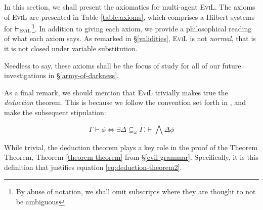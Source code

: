 In this section, we shall present the axiomatics for multi-agent
\textsc{EviL}. The axioms of \textsc{EviL} are presented in 
Table \ref{table:axioms}, which comprises a Hilbert systems for
$\vdash_{\textsc{EviL}}$\footnote{By abuse of notation, we shall omit
  subscripts where they are thought to not be ambiguous}.  In addition
to giving each axiom, we provide a philosophical reading of what each
axiom says.  As remarked in \S\ref{validities}, \textsc{EviL} is not
\emph{normal}, that is it is not closed under variable substitution.



Needless to say, these axioms shall be the focus of study for all of
our future investigations in \S\ref{army-of-darkness}.

As a final remark, we should mention that \textsc{EviL} trivially
makes true the \emph{deduction} theorem. This is because we follow
the convention set forth in \cite[Definition 4.4,
pg. 192]{blackburn_modal_2001}, and make the subsequent stipulation:
\begin{mydef}
\[ \Gamma \vdash \phi \iff  \exists \Delta \subseteq_\omega
\Gamma. \vdash \bigwedge \Delta \phi \]
\end{mydef}
While trivial, the deduction theorem plays a key role in the proof of
the Theorem Theorem, Theorem \ref{theorem-theorem} from
\S\ref{evil-grammar}.  Specifically, it is this definition that
justifies equation \ref{eq:deduction-theorem2}.





